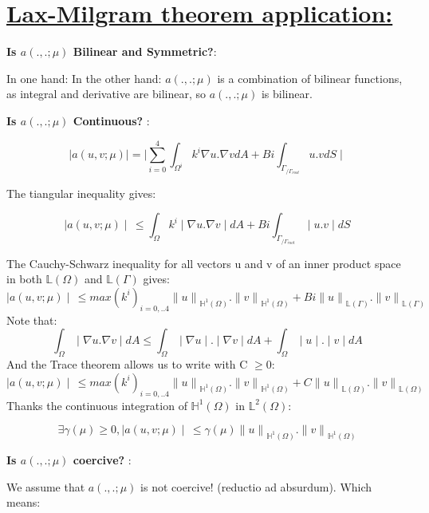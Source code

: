 \section[Question b: Lax-Milgram theorem application]{\uline{Lax-Milgram theorem application:}}
 
\textbf{Is $a(., .; \mu)$ Bilinear and Symmetric?}: 

In one hand:
In the other hand:
$a(., .; \mu)$ is a combination of bilinear functions, as integral and derivative are bilinear, so $a(., .; \mu)$ is bilinear.

\textbf{Is $a(., .; \mu)$ Continuous?} : 

$$\mid a(u, v; \mu)\mid = \mid \sum_{i=0}^4 \int_{\Omega^i} k^i \nabla u. \nabla v dA 
 + Bi\int_{\Gamma_{/\Gamma_{root}}} u . v dS\mid$$
 
The tiangular inequality gives:

$$\mid a(u, v; \mu)\mid \,\leq  \int_{\Omega} k^i \mid \nabla u. \nabla v \mid dA 
 + Bi\int_{\Gamma_{/\Gamma_{root}}} \mid u . v \mid dS$$
 
The Cauchy-Schwarz inequality for all vectors u and v of an inner product space in both $\mathbb{L}(\Omega)$ and $\mathbb{L}(\Gamma)$ gives:
$$\mid a(u, v; \mu)\mid \,\leq  {max(k^i)}_{i=0,..4} {\lVert{u}\rVert}_{\mathbb{H}^1(\Omega)}. {\lVert{v}\rVert}_{\mathbb{H}^1(\Omega)}
 + Bi {\lVert{u}\rVert}_{\mathbb{L}(\Gamma)}. {\lVert{v}\rVert}_{\mathbb{L}(\Gamma)} $$
Note that:
$$\int_{\Omega}\mid \nabla u. \nabla v \mid dA \leq \int_{\Omega}\mid \nabla u \mid . \mid \nabla v \mid dA
+
\int_{\Omega}\mid u \mid . \mid v \mid dA
$$
And the Trace theorem allows us to write with C $\geq 0$:
$$\mid a(u, v; \mu)\mid \,\leq  {max(k^i)}_{i=0,..4} {\lVert{u}\rVert}_{\mathbb{H}^1(\Omega)}. {\lVert{v}\rVert}_{\mathbb{H}^1(\Omega)}
 + C {\lVert{u}\rVert}_{\mathbb{L}(\Omega)}. {\lVert{v}\rVert}_{\mathbb{L}(\Omega)} $$
Thanks the continuous integration of $\mathbb{H}^1(\Omega)$ in $\mathbb{L}^2(\Omega)$:

$$ \exists \gamma(\mu) \geq 0, \mid a(u, v; \mu)\mid \,\leq 
\gamma(\mu){\lVert{u}\rVert}_{\mathbb{H}^1(\Omega)}. 
{\lVert{v}\rVert}_{\mathbb{H}^1(\Omega)}$$

\textbf{Is $a(., .; \mu)$ coercive?} : 

We assume that $a(., .; \mu)$ is not coercive! (reductio ad absurdum). Which means:


